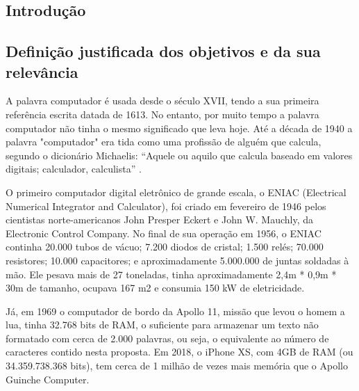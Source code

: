 \begin{samepage}
    \section{Introdução} 
    \vspace{1cm}
    \subsection{Definição justificada dos objetivos e da sua relevância}
     A palavra computador é usada desde o século XVII, tendo a sua primeira referência escrita datada de 1613. No entanto, por muito tempo a palavra computador não tinha o mesmo significado que leva hoje. Até a década de 1940 a palavra "computador" era tida como uma profissão de alguém que calcula, segundo o dicionário Michaelis: “Aquele ou aquilo que calcula baseado em valores digitais; calculador, calculista” \cite{michaels:computador}.\par
    O primeiro computador digital eletrônico de grande escala, o ENIAC (Electrical Numerical Integrator and Calculator), foi criado em fevereiro de 1946 pelos cientistas norte-americanos John Presper Eckert e John W. Mauchly, da Electronic Control Company. No final de sua operação em 1956, o ENIAC continha 20.000 tubos de vácuo; 7.200 diodos de cristal; 1.500 relés; 70.000 resistores; 10.000 capacitores; e aproximadamente 5.000.000 de juntas soldadas à mão. Ele pesava mais de 27 toneladas, tinha aproximadamente 2,4m * 0,9m * 30m de tamanho, ocupava 167 m2 e consumia 150 kW de eletricidade. \cite{wazlawick:historia_da_computacao}\par
    Já, em 1969 o computador de bordo da Apollo 11, missão que levou o homem a lua, tinha 32.768 bits de RAM, o suficiente para armazenar um texto não formatado com cerca de 2.000 palavras, ou seja, o equivalente ao número de caracteres contido nesta proposta. Em 2018, o iPhone XS, com 4GB de RAM (ou 34.359.738.368 bits), tem cerca de 1 milhão de vezes mais memória que o Apollo Guinche Computer. \cite{uol:iphone_vs_appolo}
    

\end{samepage}
